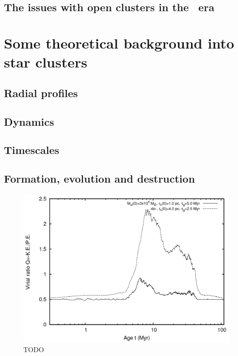 \subsection{The issues with open clusters in the \gaia\ era}
\label{sec:intro:gaia:issues}


\section{Some theoretical background into star clusters}
\label{sec:intro:theory}

\subsection{Radial profiles}
\label{sec:intro:theory:profile}


\subsection{Dynamics}
\label{sec:intro:theory:dynamics}


\subsection{Timescales}
\label{sec:intro:theory:timescales}


\subsection{Formation, evolution and destruction}
\label{sec:intro:theory:evolution}

\begin{figure}[tb]
	\includegraphics[width=\textwidth]{fig/c1/virialisation_placid_gas_expulsion.png}
	\caption[TODO]{TODO}
	\label{fig:intro:theory:feedback}
\end{figure}


